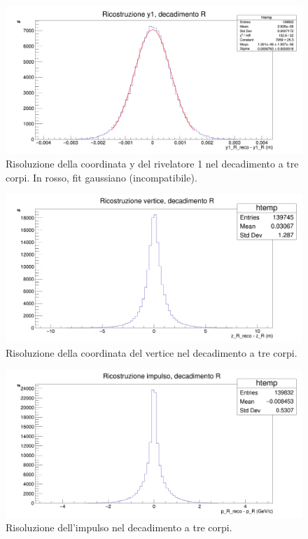 \documentclass[8pt]{extarticle}
\begin{document}
\begin{figure}[!h]
\begin{center}
\includegraphics[scale=0.25]{reco_y1_R}
\caption{Risoluzione della coordinata y del rivelatore 1 nel decadimento a tre corpi. In rosso, fit gaussiano (incompatibile).}
\label{fig:reco_y1_R}
\end{center}
\end{figure}

\begin{figure}[!h]
\begin{center}
\includegraphics[scale=0.25]{reco_z_R}
\caption{Risoluzione della coordinata del vertice nel decadimento a tre corpi.}
\label{fig:reco_z_R}
\end{center}
\end{figure}


\begin{figure}[!h]
\begin{center}
\includegraphics[scale=0.25]{reco_p_R}
\caption{Risoluzione dell'impulso nel decadimento a tre corpi.}
\label{fig:reco_p_R}
\end{center}
\end{figure}
\end{document}

